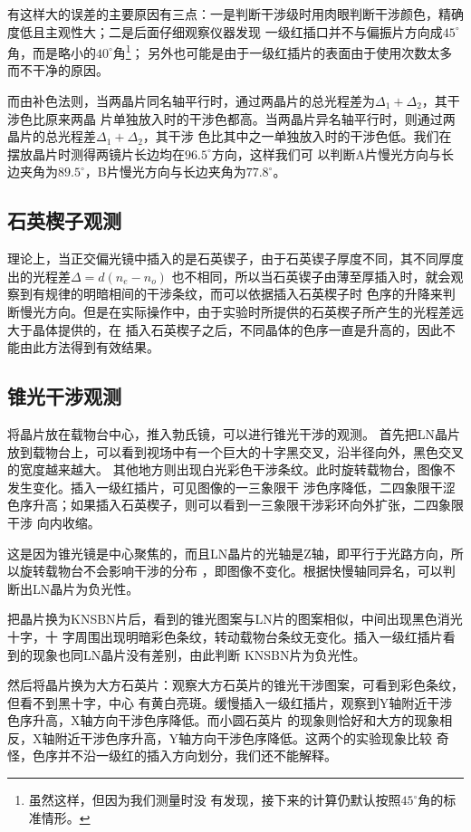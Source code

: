 \documentclass[11pt,a4paper]{article}
\begin{document}
\begin{spacing}{1.3}
\begin{CJK*}{UTF8}{gbsn}
有这样大的误差的主要原因有三点：一是判断干涉级时用肉眼判断干涉颜色，精确度低且主观性大；二是后面仔细观察仪器发现
一级红插口并不与偏振片方向成$45^{\circ}$角，而是略小的$40^{\circ}$角\footnote{虽然这样，但因为我们测量时没
有发现，接下来的计算仍默认按照$45^{\circ}$角的标准情形。}；
另外也可能是由于一级红插片的表面由于使用次数太多而不干净的原因。\par 
而由补色法则，当两晶片同名轴平行时，通过两晶片的总光程差为$\Delta_1+\Delta_2$，其干涉色比原来两晶
片单独放入时的干涉色都高。当两晶片异名轴平行时，则通过两晶片的总光程差$\Delta_1+\Delta_2$，其干涉
色比其中之一单独放入时的干涉色低。我们在摆放晶片时测得两镜片长边均在$96.5^{\circ}$方向，这样我们可
以判断A片慢光方向与长边夹角为$89.5^{\circ}$，B片慢光方向与长边夹角为$77.8^{\circ}$。

\subsection{石英楔子观测}
理论上，当正交偏光镜中插入的是石英锲子，由于石英锲子厚度不同，其不同厚度出的光程差$\Delta=d(n_e-n_o)$
也不相同，所以当石英锲子由薄至厚插入时，就会观察到有规律的明暗相间的干涉条纹，而可以依据插入石英楔子时
色序的升降来判断慢光方向。但是在实际操作中，由于实验时所提供的石英楔子所产生的光程差远大于晶体提供的，在
插入石英楔子之后，不同晶体的色序一直是升高的，因此不能由此方法得到有效结果。

\subsection{锥光干涉观测}
将晶片放在载物台中心，推入勃氏镜，可以进行锥光干涉的观测。
首先把LN晶片放到载物台上，可以看到视场中有一个巨大的十字黑交叉，沿半径向外，黑色交叉的宽度越来越大。
其他地方则出现白光彩色干涉条纹。此时旋转载物台，图像不发生变化。插入一级红插片，可见图像的一三象限干
涉色序降低，二四象限干涩色序升高；如果插入石英楔子，则可以看到一三象限干涉彩环向外扩张，二四象限干涉
向内收缩。\par 
这是因为锥光镜是中心聚焦的，而且LN晶片的光轴是Z轴，即平行于光路方向，所以旋转载物台不会影响干涉的分布
，即图像不变化。根据快慢轴同异名，可以判断出LN晶片为负光性。\par 
把晶片换为KNSBN片后，看到的锥光图案与LN片的图案相似，中间出现黑色消光十字，十
字周围出现明暗彩色条纹，转动载物台条纹无变化。插入一级红插片看到的现象也同LN晶片没有差别，由此判断
KNSBN片为负光性。\par 
然后将晶片换为大方石英片：观察大方石英片的锥光干涉图案，可看到彩色条纹，但看不到黑十字，中心
有黄白亮斑。缓慢插入一级红插片，观察到Y轴附近干涉色序升高，X轴方向干涉色序降低。而小圆石英片
的现象则恰好和大方的现象相反，X轴附近干涉色序升高，Y轴方向干涉色序降低。这两个的实验现象比较
奇怪，色序并不沿一级红的插入方向划分，我们还不能解释。


\end{CJK*}
\end{spacing}
\end{document}
